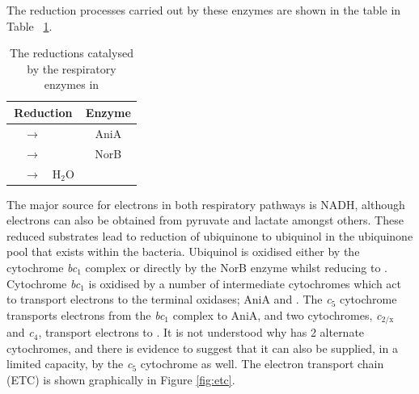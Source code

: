 The reduction processes carried out by these enzymes are shown in the table in Table ~{\ref{tab:reduction-enzymes}}.

\begin{table}[tbp]
\begin{center}
\begin{tabular}{lclc}
\toprule
\multicolumn{3}{c}{\textbf{Reduction}}& \textbf{Enzyme} \\
\midrule
\cNitrite{} & $\rightarrow$ & \cNO{} & AniA \\
\cNO{} & $\rightarrow$ & \cNtwoO{} & NorB \\
\cOxygen{} & $\rightarrow$ & H$_{\textrm{2}}$O & \cbbthree{} \\
\bottomrule
\end{tabular}
\end{center}
\caption{The reductions catalysed by the respiratory enzymes in \Nm{}
\label{tab:reduction-enzymes}}
\end{table}

The major source for electrons in both respiratory pathways is NADH, although electrons can also be obtained from pyruvate and lactate amongst others. These reduced substrates lead to reduction of ubiquinone to ubiquinol in the ubiquinone pool that exists within the bacteria. Ubiquinol is oxidised either by the cytochrome \textit{bc$_{\textrm{1}}$} complex or directly by the NorB enzyme whilst reducing \cNO{} to \cNtwoO{}. Cytochrome \textit{bc$_{\textrm{1}}$} is oxidised by a number of intermediate cytochromes which act to transport electrons to the terminal oxidases; AniA and \cbbthree{}. The \textit{c$_{\textrm{5}}$} cytochrome transports electrons from the \textit{bc$_{\textrm{1}}$} complex to AniA, and two cytochromes, \textit{c$_{\textrm{2/x}}$} and \textit{c$_{\textrm{4}}$}, transport electrons to \cbbthree{}. It is not understood why \cbbthree{} has 2 alternate cytochromes, and there is evidence to suggest that it can also be supplied, in a limited capacity, by the \textit{c$_{\textrm{5}}$} cytochrome as well\cite{Deeudom2008}. The electron transport chain (ETC) is shown graphically in Figure \ref{fig:etc}.

